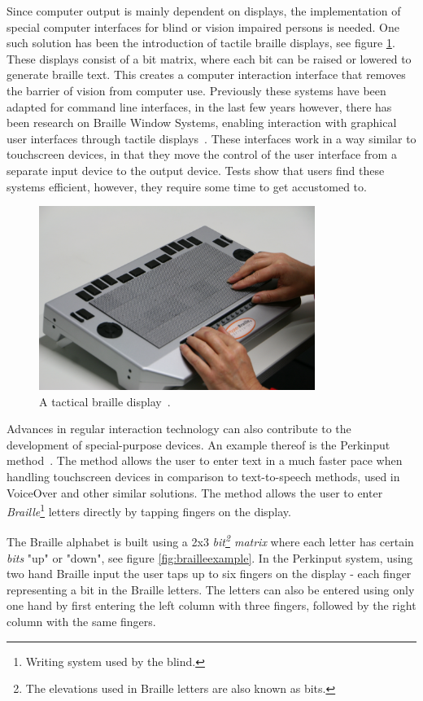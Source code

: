 Since computer output is mainly dependent on displays, the implementation of special computer interfaces for blind or vision impaired persons is needed. One such solution has been the introduction of tactile braille displays, see figure \ref{braille}. These displays consist of a bit matrix, where each bit can be raised or lowered to generate braille text. This creates a computer interaction interface that removes the barrier of vision from computer use. Previously these systems have been adapted for command line interfaces, in the last few years however, there has been research on Braille Window Systems, enabling interaction with graphical user interfaces through tactile displays~\cite{prescher2010tactile, conf/petra/SturmSKJ09}. These interfaces work in a way similar to touchscreen devices, in that they move the control of the user interface from a separate input device to the output device. Tests show that users find these systems efficient, however, they require some time to get accustomed to.

\begin{figure}[h!]
\includegraphics[width=0.8\textwidth] {bilder/IMG_7722.JPG}
\caption{A tactical braille display~\cite{brailledisplay}.}
\label{braille}
\end{figure}

Advances in regular interaction technology can also contribute to the development of special-purpose devices. An example thereof is the Perkinput method~\cite{azenkot}. The method allows the user to enter text in a much faster pace when handling touchscreen devices in comparison to text-to-speech methods, used in VoiceOver and other similar solutions. The method allows the user to enter \emph{Braille}\footnote{Writing system used by the blind.} letters directly by tapping fingers on the display.

The Braille alphabet is built using a 2x3 \emph{bit\footnote{The elevations used in Braille letters are also known as bits.} matrix} where each letter has certain \emph{bits} "up" or "down", see figure \ref{fig:brailleexample}. In the Perkinput system, using two hand Braille input the user taps up to six fingers on the display - each finger representing a bit in the Braille letters. The letters can also be entered using only one hand by first entering the left column with three fingers, followed by the right column with the same fingers.

